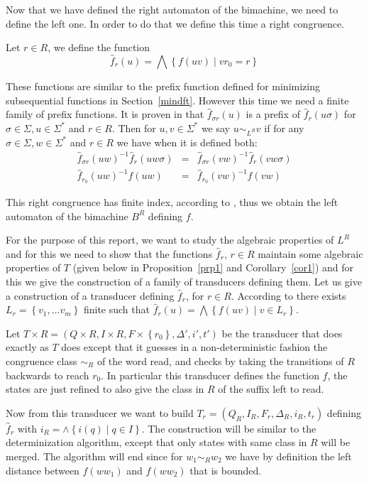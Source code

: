 \documentclass[12pt]{report}
\theoremstyle{definition}
\theoremstyle{remark}
\begin{document}
Now that we have defined the right automaton of the bimachine, we need to define the left one. In order to do that we define this time a right congruence.


Let $r\in R$, we define the function
$$\widehat f_r(u)=\bigwedge \left\{f(uv)\mid  vr_0=r \right\}$$

These functions are similar to the prefix function defined for minimizing subsequential functions in Section~\ref{mindft}. However this time we need a finite family of prefix functions.
It is proven in \cite{reutenauers91} that $\widehat f_{\sigma r}(u)$ is a prefix of $\widehat f_r(u\sigma)$ for $\sigma\in \Sigma, u\in \Sigma^\ast$ and $r\in R$.
Then for $u,v\in \Sigma^\ast$ we say $u\sim_{L^R} v$ if for any $\sigma\in \Sigma, w\in \Sigma^\ast$ and $r\in R$ we have when it is defined both:
$$\begin{array}{rcl}
\widehat f_{\sigma r}(uw)^{-1}\widehat f_{r}(uw\sigma) &=& \widehat f_{\sigma r}(vw)^{-1}\widehat f_{r}(vw\sigma)\\
\widehat f_{r_0}(uw)^{-1} f(uw) &=& \widehat f_{r_0}(vw)^{-1} f(vw)
\end{array} $$

This right congruence has finite index, according to \cite{reutenauers91}, thus we obtain the left automaton of the bimachine $B^R$ defining $f$.

For the purpose of this report, we want to study the algebraic properties of $L^R$ and for this we need to show that the functions $\widehat f_r$, $r\in R$ maintain some algebraic properties of $T$ (given below in Proposition~\ref{prp1} and Corollary~\ref{cor1}) and for this we give the construction of a family of transducers defining them.
Let us give a construction of a transducer defining $\widehat f_r$, for $r\in R$.
According to \cite{reutenauers91} there exists $L_r=\left\{ v_1,\ldots v_m\right\}$ finite such that $\widehat f_r(u)=\bigwedge \left\{f(uv)\mid  v\in L_r \right\}$.

Let $T\times R=(Q\times R,I\times R,F\times\left\{ r_0\right\},\Delta',i',t')$ be the transducer that does exactly as $T$ does except that it guesses in a non-deterministic fashion the congruence class $\sim_R$ of the word read, and checks by taking the transitions of $R$ backwards to reach $r_0$.
In particular this transducer defines the function $f$, the states are just refined to also give the class in $R$ of the suffix left to read.

Now from this transducer we want to build $T_r=(Q_R,I_R,F_r,\Delta_R,i_R,t_r)$ defining $\widehat f_r$ with $i_R=\wedge\left\{i(q)\mid q\in I\right\}$.
The construction will be similar to the determinization algorithm, except that only states with same class in $R$ will be merged.
The algorithm will end since for $w_1{\sim_R}w_2$ we have by definition the left distance between $f(ww_1)$ and $f(ww_2)$ that is bounded.
\end{document}
